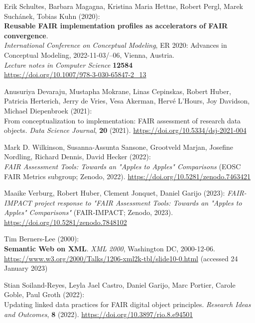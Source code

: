 \begin{thebibliography}{9}
{
Erik Schultes, Barbara Magagna, Kristina Maria Hettne, Robert Pergl,
Marek Suchánek, Tobias Kuhn (2020): \\
\textbf{Reusable {FAIR} implementation profiles as accelerators of {FAIR} convergence}.\\
\emph{International Conference on Conceptual Modeling}, ER 2020: Advances in Conceptual Modeling, 2022-11-03/--06, Vienna, Austria. \\
\emph{Lecture notes in Computer Science} \textbf{12584} \\ 
\url{https://doi.org/10.1007/978-3-030-65847-2_13}

Anusuriya Devaraju, Mustapha Mokrane, Linas Cepinskas, Robert Huber,
Patricia Herterich, Jerry de Vries, Vesa Akerman, Hervé L'Hours, Joy
Davidson, Michael Diepenbroek (2021): \\
From conceptualization to
implementation: {FAIR} assessment of research data objects. \emph{Data
Science Journal}, \textbf{20} (2021).
\url{https://doi.org/10.5334/dsj-2021-004}

Mark D. Wilkinson, Susanna-Assunta Sansone, Grootveld Marjan, Josefine
Nordling, Richard Dennis, David Hecker (2022): \\
\emph{{FAIR Assessment
Tools: Towards an "Apples to Apples" Comparisons}} ({EOSC} {FAIR}
Metrics subgroup; Zenodo, 2022).
\url{https://doi.org/10.5281/zenodo.7463421}

Maaike Verburg, Robert Huber, Clement Jonquet, Daniel Garijo (2023):
\emph{{FAIR-IMPACT project response to "FAIR Assessment Tools: Towards
an "Apples to Apples" Comparisons"}} ({FAIR-IMPACT}; Zenodo, 2023).
\url{https://doi.org/10.5281/zenodo.7848102}

Tim Berners-Lee (2000): \\
\textbf{Semantic Web on XML}. 
\emph{XML 2000}, Washington DC, 2000-12-06. \\
\url{https://www.w3.org/2000/Talks/1206-xml2k-tbl/slide10-0.html}
(accessed 24 January 2023)

Stian Soiland-Reyes, Leyla Jael Castro, Daniel Garijo, Marc Portier,
Carole Goble, Paul Groth (2022): \\
Updating linked data practices for
{FAIR} digital object principles. \emph{Research Ideas and Outcomes},
\textbf{8} (2022).
\url{https://doi.org/10.3897/rio.8.e94501}

}
\end{thebibliography}
